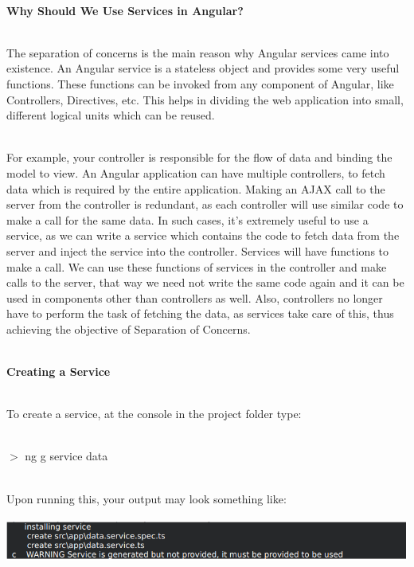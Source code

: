 \documentclass{article}
\begin{document}
\noindent 

\noindent \\ \textbf{Why Should We Use Services in Angular?}

\noindent  

\noindent \\ The separation of concerns is the main reason why Angular services came into existence. An Angular service is a stateless object and provides some very useful functions. These functions can be invoked from any component of Angular, like Controllers, Directives, etc. This helps in dividing the web application into small, different logical units which can be reused.

\noindent \\ For example, your controller is responsible for the flow of data and binding the model to view. An Angular application can have multiple controllers, to fetch data which is required by the entire application. Making an AJAX call to the server from the controller is redundant, as each controller will use similar code to make a call for the same data. In such cases, it's extremely useful to use a service, as we can write a service which contains the code to fetch data from the server and inject the service into the controller. Services will have functions to make a call. We can use these functions of services in the controller and make calls to the server, that way we need not write the same code again and it can be used in components other than controllers as well. Also, controllers no longer have to perform the task of fetching the data, as services take care of this, thus achieving the objective of Separation of Concerns.

\noindent 

\noindent \\ \textbf{Creating a Service}

\noindent 

\noindent \\ To create a service, at the console in the project folder type:

\noindent \\ $\mathrm{>}$ ng g service data  

\noindent \\ Upon running this, your output may look something like:

\begin{center}
	\noindent \includegraphics*[width=6.24in, height=0.61in]{IMG-05-04}
\end{center}
\end{document}

